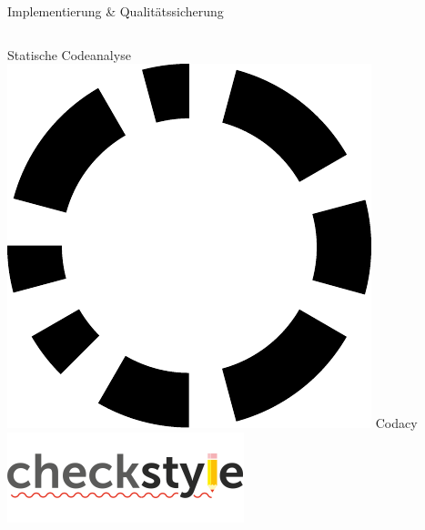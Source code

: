 \documentclass[xcolor=dvipsnames]{beamer}
\begin{document}
\begin{frame}{Implementierung \& Qualitätssicherung}
\begin{columns}
\begin{column}{0.5\textwidth}
\begin{block}{Statische Codeanalyse}
                    \includegraphics[width=(\textwidth / 2)]{img/codacy.pdf}
                    Codacy\\
                    \includegraphics[width=(\textwidth / 2)]{img/checkstyle} %
                \end{block}
            \end{column}
        \end{columns}
    \end{frame}
\end{document}

